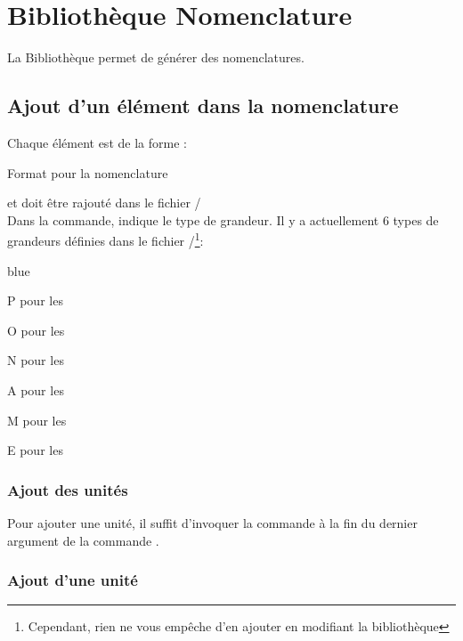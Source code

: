 \chapter{Bibliothèque Nomenclature}
\label{addNomenclature}

La Bibliothèque  permet de générer des nomenclatures.

\section{Ajout d'un élément dans la nomenclature}

Chaque élément est de la forme :\\

\begin{Latex}{Format pour la nomenclature}

\end{Latex}
et doit être rajouté dans le fichier /\\


Dans la commande,  indique le type de grandeur. Il y a actuellement 6 types de grandeurs définies dans le fichier /\footnote{Cependant, rien ne vous empêche d'en ajouter en modifiant la bibliothèque}: 

\begin{items}{blue}{\Bullet}
\item P pour les 
\item O pour les 
\item N pour les 
\item A pour les 
\item M pour les 
\item E pour les 
\end{items}  


\subsection{Ajout des unités}

Pour ajouter une unité, il suffit d'invoquer la commande  à la fin du dernier argument de la commande .

\subsection{Ajout d'une unité}

